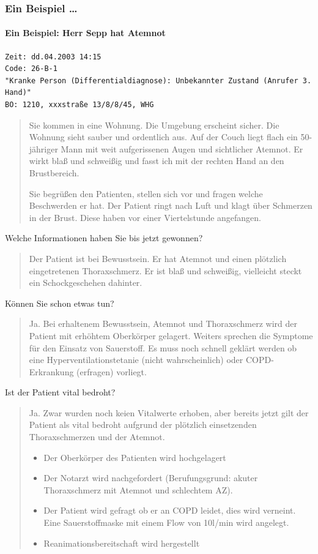 \clearpage


\subsubsection{Ein Beispiel \ldots}
\paragraph[Ein Beispiel: Herr Sepp hat Atemnot]{Ein Beispiel: Herr Sepp
hat Atemnot}

\begin{verbatim}
Zeit: dd.04.2003 14:15
Code: 26-B-1 
"Kranke Person (Differentialdiagnose): Unbekannter Zustand (Anrufer 3. Hand)" 
BO: 1210, xxxstraße 13/8/8/45, WHG

\end{verbatim}

\begin{quote}
Sie kommen in eine Wohnung. Die Umgebung erscheint sicher. Die Wohnung
sieht sauber und ordentlich aus. Auf der Couch liegt flach ein
50-jähriger Mann mit weit aufgerissenen Augen und
sichtlicher Atemnot. Er wirkt blaß und schweißig und fasst ich mit der
rechten Hand an den Brustbereich.

Sie begrüßen den Patienten, stellen sich vor und fragen welche
Beschwerden er hat. Der Patient ringt nach Luft und klagt über
Schmerzen in der Brust. Diese haben vor einer Viertelstunde angefangen.
\end{quote}

Welche Informationen haben Sie bis jetzt gewonnen?
\begin{quote}
Der Patient ist bei Bewusstsein. Er hat Atemnot und einen plötzlich
eingetretenen Thoraxschmerz. Er ist blaß und schweißig,
vielleicht steckt ein Schockgeschehen dahinter.
\end{quote}
Können Sie schon etwas tun?
\begin{quote}
Ja.  Bei erhaltenem Bewusstsein, Atemnot und Thoraxschmerz wird der
Patient mit erhöhtem Oberkörper gelagert. Weiters sprechen die
Symptome für den Einsatz von Sauerstoff. Es muss noch schnell
gekl\"art werden ob eine Hyperventilationstetanie (nicht
wahrscheinlich) oder COPD-Erkrankung (erfragen) vorliegt.
\end{quote}
Ist der Patient vital bedroht?
\begin{quote}
Ja. Zwar wurden noch keien Vitalwerte erhoben, aber bereits jetzt gilt
der Patient als vital bedroht aufgrund der plötzlich einsetzenden
Thoraxschmerzen und der Atemnot.

\begin{itemize}
    \item Der Oberkörper des Patienten wird hochgelagert
    \item Der Notarzt wird nachgefordert (Berufungsgrund: akuter
    Thoraxschmerz mit Atemnot und schlechtem AZ).
    \item Der Patient wird gefragt ob er an COPD leidet, dies wird verneint.
    Eine Sauerstoffmaske mit einem Flow von 10l/min wird angelegt.
    \item Reanimationsbereitschaft wird hergestellt
\end{itemize}
\end{quote}

